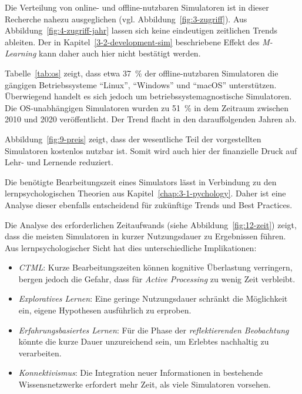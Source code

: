 Die Verteilung von online- und offline-nutzbaren Simulatoren ist in dieser Recherche nahezu ausgeglichen (vgl. Abbildung~\ref{fig:3-zugriff}). Aus Abbildung~\ref{fig:4-zugriff-jahr} lassen sich keine eindeutigen zeitlichen Trends ableiten. Der in Kapitel~\ref{3-2-development-sim} beschriebene Effekt des \textit{M-Learning} kann daher auch hier nicht bestätigt werden.

Tabelle~\ref{tab:os} zeigt, dass etwa 37~\% der offline-nutzbaren Simulatoren die gängigen Betriebssysteme \enquote{Linux}, \enquote{Windows} und \enquote{macOS} unterstützen. Überwiegend handelt es sich jedoch um betriebssystemagnostische Simulatoren. Die OS-unabhängigen Simulatoren wurden zu 51~\% in dem Zeitraum zwischen 2010 und 2020 veröffentlicht. Der Trend flacht in den darauffolgenden Jahren ab.

Abbildung~\ref{fig:9-preis} zeigt, dass der wesentliche Teil der vorgestellten Simulatoren kostenlos nutzbar ist. Somit wird auch hier der finanzielle Druck auf Lehr- und Lernende reduziert.

Die benötigte Bearbeitungszeit eines Simulators lässt in Verbindung zu den lernpsychologischen Theorien aus Kapitel~\ref{chap:3-1-pychology}. Daher ist eine Analyse dieser ebenfalls entscheidend für zukünftige Trends und Best Practices.

Die Analyse des erforderlichen Zeitaufwands (siehe Abbildung~\ref{fig:12-zeit}) zeigt, dass die meisten Simulatoren in kurzer Nutzungsdauer zu Ergebnissen führen. Aus lernpsychologischer Sicht hat dies unterschiedliche Implikationen:

\begin{itemize}
    \item \textit{\ac{CTML}}: Kurze Bearbeitungszeiten können kognitive Überlastung verringern, bergen jedoch die Gefahr, dass für \textit{Active Processing} zu wenig Zeit verbleibt.
    \item \textit{Exploratives Lernen}: Eine geringe Nutzungsdauer schränkt die Möglichkeit ein, eigene Hypothesen ausführlich zu erproben.
    \item \textit{Erfahrungsbasiertes Lernen}: Für die Phase der \textit{reflektierenden Beobachtung} könnte die kurze Dauer unzureichend sein, um Erlebtes nachhaltig zu verarbeiten.
    \item \textit{Konnektivismus}: Die Integration neuer Informationen in bestehende Wissensnetzwerke erfordert mehr Zeit, als viele Simulatoren vorsehen.
\end{itemize}

